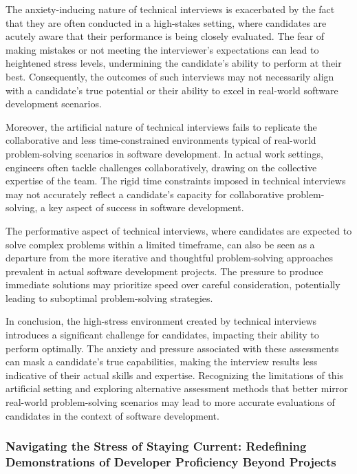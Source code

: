 \documentclass[
    a4paper, %
    10pt, %
    unnumberedsections, %
    twoside, %
]{LTJournalArticle}
\begin{document}
The anxiety-inducing nature of technical interviews is exacerbated by the fact that they are often conducted in a high-stakes setting, where candidates are acutely aware that their performance is being closely evaluated. The fear of making mistakes or not meeting the interviewer's expectations can lead to heightened stress levels, undermining the candidate's ability to perform at their best. Consequently, the outcomes of such interviews may not necessarily align with a candidate's true potential or their ability to excel in real-world software development scenarios.

Moreover, the artificial nature of technical interviews fails to replicate the collaborative and less time-constrained environments typical of real-world problem-solving scenarios in software development. In actual work settings, engineers often tackle challenges collaboratively, drawing on the collective expertise of the team. The rigid time constraints imposed in technical interviews may not accurately reflect a candidate's capacity for collaborative problem-solving, a key aspect of success in software development.

The performative aspect of technical interviews, where candidates are expected to solve complex problems within a limited timeframe, can also be seen as a departure from the more iterative and thoughtful problem-solving approaches prevalent in actual software development projects. The pressure to produce immediate solutions may prioritize speed over careful consideration, potentially leading to suboptimal problem-solving strategies.

In conclusion, the high-stress environment created by technical interviews introduces a significant challenge for candidates, impacting their ability to perform optimally. The anxiety and pressure associated with these assessments can mask a candidate's true capabilities, making the interview results less indicative of their actual skills and expertise. Recognizing the limitations of this artificial setting and exploring alternative assessment methods that better mirror real-world problem-solving scenarios may lead to more accurate evaluations of candidates in the context of software development.


\subsubsection*{Navigating the Stress of Staying Current: Redefining Demonstrations of Developer Proficiency Beyond Projects}
\end{document}
